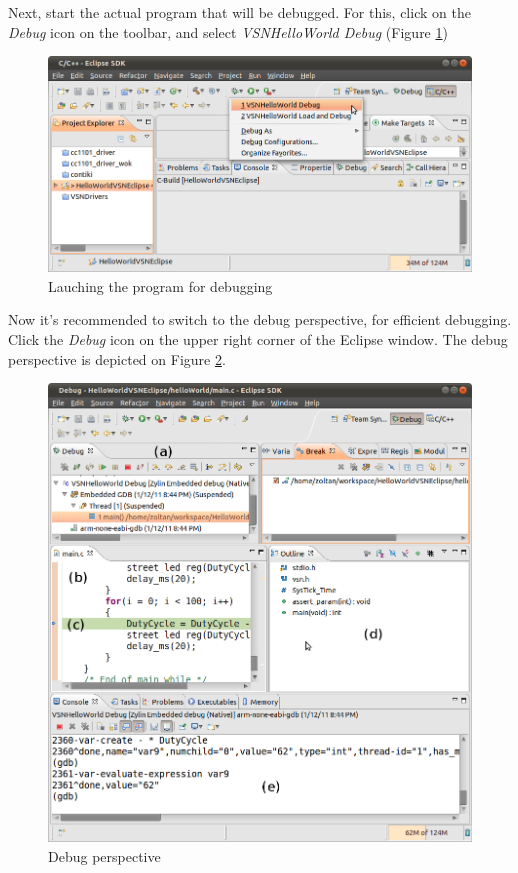 \documentclass[a4paper, 10pt]{article}
\begin{document}
Next, start the actual program that will be debugged.
For this, click on the \emph{Debug} icon on the toolbar, and select
\emph{VSNHelloWorld Debug}
(Figure \ref{fig:debug-launch})

    \begin{figure}[H]
    \centering
        \includegraphics[width=\textwidth]{./png-install-guide/debug-launch.png}
        \caption{Lauching the program for debugging}
        \label{fig:debug-launch}
    \end{figure}

Now it's recommended to switch to the debug perspective,
for efficient debugging.
Click the \emph{Debug} icon on the upper right corner of the Eclipse window.
The debug perspective is depicted on Figure \ref{fig:debug-window}.


    \begin{figure}[H]
    \centering
        \includegraphics[width=\textwidth]{./png-install-guide/debug-window.png}
        \caption{Debug perspective}
        \label{fig:debug-window}
    \end{figure}
\end{document}
